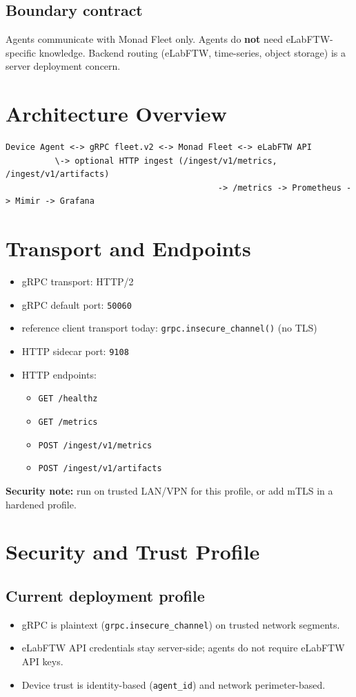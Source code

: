 \documentclass[11pt,a4paper]{article}
\begin{document}
\subsection{Boundary contract}
Agents communicate with Monad Fleet only.
Agents do \textbf{not} need eLabFTW-specific knowledge.
Backend routing (eLabFTW, time-series, object storage) is a server deployment concern.

\section{Architecture Overview}
\begin{verbatim}
Device Agent <-> gRPC fleet.v2 <-> Monad Fleet <-> eLabFTW API
          \-> optional HTTP ingest (/ingest/v1/metrics, /ingest/v1/artifacts)
                                           -> /metrics -> Prometheus -> Mimir -> Grafana
\end{verbatim}

\section{Transport and Endpoints}
\begin{itemize}
  \item gRPC transport: HTTP/2
  \item gRPC default port: \texttt{50060}
  \item reference client transport today: \texttt{grpc.insecure\_channel()} (no TLS)
  \item HTTP sidecar port: \texttt{9108}
  \item HTTP endpoints:
    \begin{itemize}
      \item \texttt{GET /healthz}
      \item \texttt{GET /metrics}
      \item \texttt{POST /ingest/v1/metrics}
      \item \texttt{POST /ingest/v1/artifacts}
    \end{itemize}
\end{itemize}

\textbf{Security note:} run on trusted LAN/VPN for this profile, or add mTLS in a hardened profile.

\section{Security and Trust Profile}
\subsection{Current deployment profile}
\begin{itemize}
  \item gRPC is plaintext (\texttt{grpc.insecure\_channel}) on trusted network segments.
  \item eLabFTW API credentials stay server-side; agents do not require eLabFTW API keys.
  \item Device trust is identity-based (\texttt{agent\_id}) and network perimeter-based.
\end{itemize}
\end{document}
